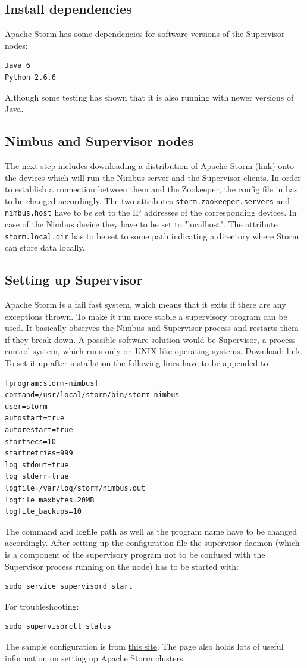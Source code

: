 \documentclass[12pt,a4paper]{article}
\begin{document}
\subsection{Install dependencies}
Apache Storm has some dependencies for software versions of the Supervisor nodes:
\begin{verbatim}
Java 6
Python 2.6.6
\end{verbatim}
Although some testing has shown that it is also running with newer versions of Java.
\subsection{Nimbus and Supervisor nodes}
The next step includes downloading a distribution of Apache Storm (\href{http://storm.apache.org/downloads.html}{link}) onto the devices which will run the Nimbus server and the Supervisor clients.
In order to establish a connection between them and the Zookeeper, the config file in  has to be changed accordingly. The two attributes \verb!storm.zookeeper.servers! and \verb!nimbus.host! have to be set to the IP addresses of the corresponding devices. In case of the Nimbus device they have to be set to "localhost". The attribute \verb!storm.local.dir! has to be set to some path indicating a directory where Storm can store data locally.
\subsection{Setting up Supervisor}
Apache Storm is a fail fast system, which means that it exits if there are any exceptions thrown. To make it run more stable a supervisory program can be used. It basically observes the Nimbus and Supervisor process and restarts them if they break down. A possible software solution would be Supervisor, a process control system, which runs only on UNIX-like operating systems. Download: \href{http://supervisord.org/#}{link}.
To set it up after installation the following lines have to be appended to 
\begin{verbatim}
[program:storm-nimbus]
command=/usr/local/storm/bin/storm nimbus
user=storm
autostart=true
autorestart=true
startsecs=10
startretries=999
log_stdout=true
log_stderr=true
logfile=/var/log/storm/nimbus.out
logfile_maxbytes=20MB
logfile_backups=10
\end{verbatim}
The command and logfile path as well as the program name have to be changed accordingly. After setting up the configuration file the supervisor daemon (which is a component of the supervisory program not to be confused with the Supervisor process running on the node) has to be started with: 
\begin{verbatim}
sudo service supervisord start
\end{verbatim}
For troubleshooting:
\begin{verbatim}
sudo supervisorctl status
\end{verbatim}
The sample configuration is from \href{http://www.michael-noll.com/tutorials/running-multi-node-storm-cluster/#install-supervisord}{this site}. The page also holds lots of useful information on setting up Apache Storm clusters.
\end{document}
